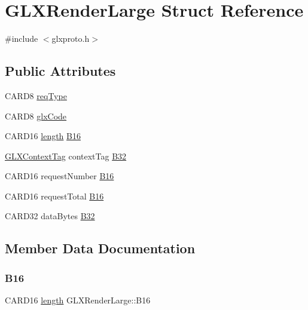 \hypertarget{struct_g_l_x_render_large}{}\section{G\+L\+X\+Render\+Large Struct Reference}
\label{struct_g_l_x_render_large}


{\ttfamily \#include $<$glxproto.\+h$>$}

\subsection*{Public Attributes}
\begin{DoxyCompactItemize}
\item 
C\+A\+R\+D8 \hyperlink{struct_g_l_x_render_large_aec2920127a5ad63e4fd091de1b28581c}{req\+Type}
\item 
C\+A\+R\+D8 \hyperlink{struct_g_l_x_render_large_a75fc00fd14c1f89b198f65f0bdfcd883}{glx\+Code}
\item 
C\+A\+R\+D16 \hyperlink{glcorearb_8h_ab9c919755bde3b34349e23a32b4e0fa7}{length} \hyperlink{struct_g_l_x_render_large_aaa482dbc64ca1bbf7ed71b42d8022b81}{B16}
\item 
\hyperlink{glxproto_8h_ae71763ce00c9fa460beb4699af678691}{G\+L\+X\+Context\+Tag} context\+Tag \hyperlink{struct_g_l_x_render_large_a910f3f05bc4a59b9168981a1a129dc9a}{B32}
\item 
C\+A\+R\+D16 request\+Number \hyperlink{struct_g_l_x_render_large_a314c464c54e191fd0ab643976c79c9dd}{B16}
\item 
C\+A\+R\+D16 request\+Total \hyperlink{struct_g_l_x_render_large_a9110b7a1c7ee67b429fe72e9e22fe375}{B16}
\item 
C\+A\+R\+D32 data\+Bytes \hyperlink{struct_g_l_x_render_large_a6be55cfde4b61ec0689e6f168042d844}{B32}
\end{DoxyCompactItemize}


\subsection{Member Data Documentation}
\mbox{\label{struct_g_l_x_render_large_aaa482dbc64ca1bbf7ed71b42d8022b81}} 
\subsubsection{\texorpdfstring{B16}{B16}\hspace{0.1cm}{\footnotesize\ttfamily [1/3]}}
{\footnotesize\ttfamily C\+A\+R\+D16 \hyperlink{glcorearb_8h_ab9c919755bde3b34349e23a32b4e0fa7}{length} G\+L\+X\+Render\+Large\+::\+B16}

